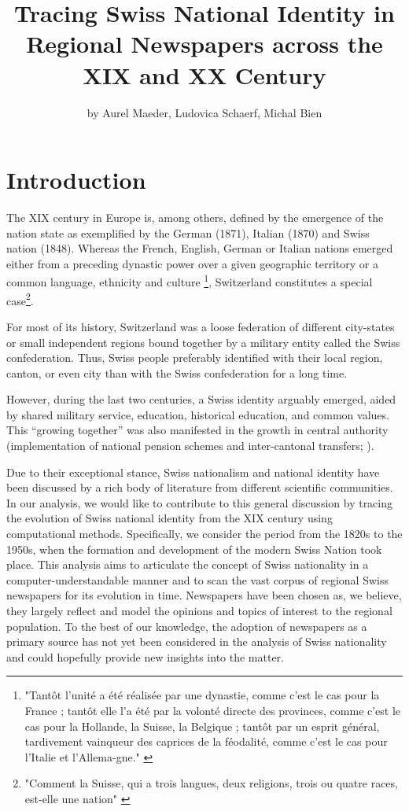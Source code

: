 \documentclass[11pt]{article}
\title{\vspace{-2.0cm} \textbf{Tracing Swiss National Identity in Regional Newspapers across the XIX and XX Century}}
\author{by Aurel Maeder, Ludovica Schaerf, Michal Bien}
\date{}
\begin{document}
\maketitle

\section{Introduction}

The XIX century in Europe is, among others, defined by the emergence of the nation state as exemplified by the German (1871), Italian (1870) and Swiss nation (1848). Whereas the French, English, German or Italian nations emerged either from a preceding dynastic power over a given geographic territory or a common language, ethnicity and culture  \footnote{"Tantôt l'unité a été réalisée par une dynastie, comme c'est le cas pour la France ; tantôt elle l'a été par la volonté  directe  des  provinces,  comme  c'est  le  cas  pour  la  Hollande,  la Suisse,  la  Belgique ;  tantôt  par  un  esprit  général,  tardivement  vainqueur des  caprices  de  la  féodalité,  comme  c'est  le  cas  pour  l'Italie  et  l'Allema-gne." \citep{renan1882qu}}, Switzerland constitutes a special case\footnote{"Comment  la  Suisse,  qui  a  trois  langues,  deux  religions,  trois  ou  quatre races, est-elle une nation" \citep{renan1882qu}}. \par
For most of its history, Switzerland was a loose federation of different city-states or small independent regions bound together by a military entity called the Swiss confederation. Thus, Swiss people preferably identified with their local region, canton, or even city than with the Swiss confederation for a long time. \par
However, during the last two centuries, a Swiss identity arguably emerged, aided by shared military service, education, historical education, and common values. This “growing together” was also manifested in the growth in central authority (implementation of national pension schemes and inter-cantonal transfers; \cite{ladner2018schweizer}). \par
Due to their exceptional stance, Swiss nationalism and national identity have been discussed by a rich body of literature from different scientific communities. 
In our analysis, we would like to contribute to this general discussion by tracing the evolution of Swiss national identity from the XIX century using computational methods. Specifically, we consider the period from the 1820s to the 1950s, when the formation and development of the modern Swiss Nation took place. This analysis aims to articulate the concept of Swiss nationality in a computer-understandable manner and to scan the vast corpus of regional Swiss newspapers for its evolution in time. Newspapers have been chosen as, we believe, they largely reflect and model the opinions and topics of interest to the regional population. To the best of our knowledge, the adoption of newspapers as a primary source has not yet been considered in the analysis of Swiss nationality and could hopefully provide new insights into the matter. \par
\end{document}
